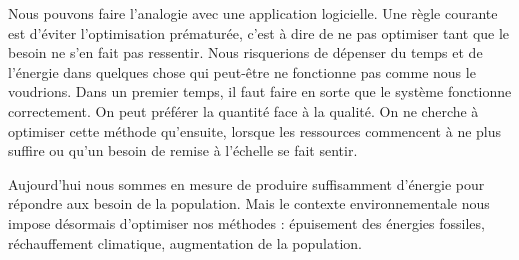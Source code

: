 Nous pouvons faire l’analogie avec une application logicielle. Une règle courante est d’éviter
l’optimisation prématurée, c’est à dire de ne pas optimiser tant que le besoin ne s’en fait pas
ressentir. Nous risquerions de dépenser du temps et de l'énergie dans quelques chose qui
peut-être ne fonctionne pas comme nous le voudrions.
Dans un premier temps, il faut faire en sorte que le système fonctionne correctement.
On peut préférer la quantité face à la qualité. On ne cherche à optimiser cette méthode
qu’ensuite, lorsque les ressources commencent à ne plus suffire ou qu’un besoin de remise
à l’échelle se fait sentir.

Aujourd'hui nous sommes en mesure de produire suffisamment d’énergie pour répondre aux
besoin de la population. Mais le contexte environnementale nous impose désormais d’optimiser
nos méthodes : épuisement des énergies fossiles, réchauffement climatique, augmentation de la
population.
